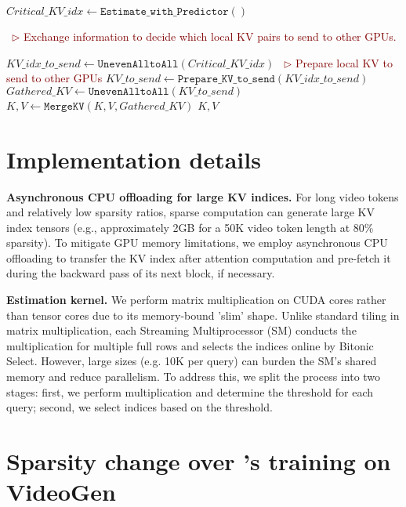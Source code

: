 \begin{algorithm}[h]
\begin{algorithmic}[1]
\State $Critical\_{KV}\_idx \gets \texttt{Estimate\_with\_Predictor}()$


 \Statex\quad\ {\textcolor{Maroon}{$\triangleright$ {Exchange information to decide which local KV pairs to send to other GPUs.}}}

\State $KV\_idx\_to\_send \gets 
\texttt{UnevenAlltoAll}(Critical\_{KV}\_idx)$
 \Statex\quad\ {\textcolor{Maroon}{$\triangleright$ {Prepare local KV to send to other GPUs}}}
\State $KV\_to\_send \gets \texttt{Prepare\_KV\_to\_send}(KV\_idx\_to\_send)$ 
\State $Gathered\_KV  \gets \texttt{UnevenAlltoAll}(KV\_to\_send)$
\State $K,V \gets \texttt{MergeKV}(K,V,Gathered\_KV)$
\State \Return $K,V$

\EndFunction

\end{algorithmic}
\end{algorithm}


\section{Implementation details}\label{appendix:imple}

\noindent\textbf{Asynchronous CPU offloading for large KV indices.} For long video tokens and relatively low sparsity ratios, sparse computation can generate large KV index tensors (e.g., approximately 2GB for a 50K video token length at 80\% sparsity). To mitigate GPU memory limitations, we employ asynchronous CPU offloading to transfer the KV index after attention computation and pre-fetch it during the backward pass of its next block, if necessary.

\noindent\textbf{Estimation kernel.} We perform matrix multiplication on CUDA cores rather than tensor cores due to its memory-bound 'slim' shape. Unlike standard tiling in matrix multiplication, each Streaming Multiprocessor (SM) conducts the multiplication for multiple full rows and selects the \topk indices online by Bitonic Select. However, large \topk sizes (e.g. 10K per query) can burden the SM's shared memory and reduce parallelism. To address this, we split the process into two stages: first, we perform multiplication and determine the \topk threshold for each query; second, we select indices based on the threshold.



\section{Sparsity change over \sys's training on VideoGen}\label{appendix:videogen_sparsity}

